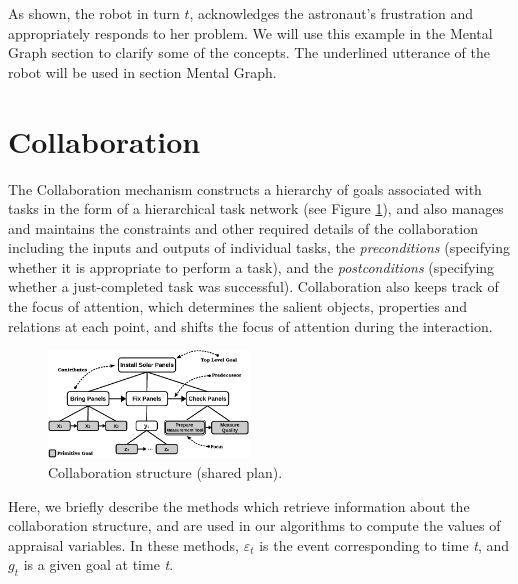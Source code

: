 \documentclass{aamas2016}
\begin{document}
\vspace*{-1mm}
As shown, the robot in turn $t$, acknowledges the astronaut's frustration and
appropriately responds to her problem. We will use this example in the Mental
Graph section to clarify some of the concepts. The underlined utterance of the
robot will be used in section Mental Graph.

\section{Collaboration}

The Collaboration mechanism constructs a hierarchy of goals associated with
tasks in the form of a hierarchical task network (see Figure \ref{fig:cs}), and
also manages and maintains the constraints and other required details of the
collaboration including the inputs and outputs of individual tasks, the
\textit{preconditions} (specifying whether it is appropriate to perform a task),
and the \textit{postconditions} (specifying whether a just-completed task was
successful). Collaboration also keeps track of the focus of attention, which
determines the salient objects, properties and relations at each point, and
shifts the focus of attention during the interaction.

\begin{figure}[tbh]
  \centering
  \includegraphics[width=0.474\textwidth]{figure/collaborationStructure-croped.pdf}
  \caption{{\fontsize{9}{9}\selectfont Collaboration structure (shared plan).}}
  \label{fig:cs}
\end{figure}

Here, we briefly describe the methods which retrieve information about the
collaboration structure, and are used in our algorithms to compute the values of
appraisal variables. In these methods, $\varepsilon_t$ is the event
corresponding to time \textit{t}, and $g_t$ is a given goal at time \textit{t}. 
\end{document}
